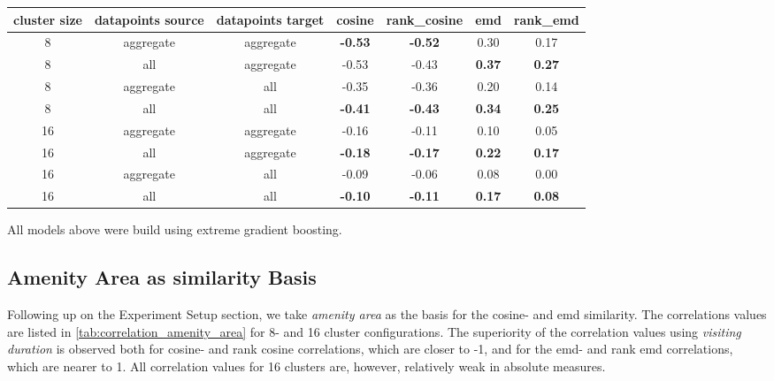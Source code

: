 \documentclass{ws-ijait}
\newcommand{\cmmnt}[1]{\ignorespaces}
\begin{document}
	\begin{table}[!ht]
		{\begin{tabular}{ | c | c | c | c | c | c | c | }
				\hline
				{cluster size} & {datapoints source} & {datapoints target} & cosine & rank\_cosine & emd & rank\_emd \\ \hline
				8	&	aggregate 	&	aggregate 	& 	\textbf{-0.53}	&	\textbf{-0.52}	&	0.30	&	0.17 	\\ \hline
				8	&	all 		&	aggregate 	& 	-0.53	&	-0.43	&	\textbf{0.37}	&	\textbf{0.27}	\\ \hline \hline
				8	&	aggregate 	&	all 		& 	-0.35	&	-0.36	&	0.20	&	0.14	\\ \hline
				8	&	all			& 	all 		&	\textbf{-0.41}	&	\textbf{-0.43}	&	\textbf{0.34}	&	\textbf{0.25}	\\ \hline \hline
				16	&	aggregate	& 	aggregate 	&	-0.16	&	-0.11	&	0.10	&	0.05	\\ \hline
				16	&	all			& 	aggregate 	& 	\textbf{-0.18}	&	\textbf{-0.17}	&	\textbf{0.22}	&	\textbf{0.17}	\\ \hline \hline
				16	&	aggregate	& 	all 		& 	-0.09	&	-0.06	&	0.08	&	0.00	\\ \hline
				16	&	all			&	all 		&	\textbf{-0.10}	&	\textbf{-0.11}	&	\textbf{0.17}	&	\textbf{0.08}	\\ \hline \hline
		\end{tabular}}
		\label{tab:correlation_values}
		\begin{tabnote}
			All models above were build using extreme gradient boosting.
		\end{tabnote}
	\end{table}
	
	\subsection{Amenity Area as similarity Basis}
	Following up on \cmmnt{\cref{experimental_setup:amenity_area}} the Experiment Setup section, we take \textit{amenity area} as the basis for the cosine- and emd similarity. The correlations values are listed in \cref{tab:correlation_amenity_area} for 8- and 16 cluster configurations. The superiority of the correlation values using \textit{visiting duration} is observed both for cosine- and rank cosine correlations, which are closer to -1, and for the emd- and rank emd correlations, which are nearer to 1. All correlation values for 16 clusters are, however, relatively weak in absolute measures.
	
\end{document}

